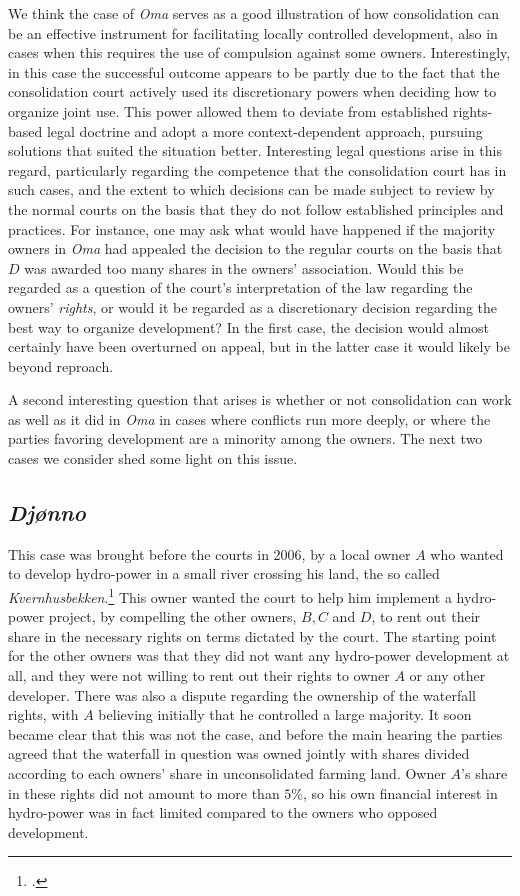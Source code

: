 We think the case of \emph{Oma} serves as a good illustration of how consolidation can be an effective instrument for facilitating locally controlled development, also in cases when this requires the use of compulsion against some owners. Interestingly, in this case the successful outcome appears to be partly due to the fact that the consolidation court actively used its discretionary powers when deciding how to organize joint use. This power allowed them to deviate from established rights-based legal doctrine and adopt a more context-dependent approach, pursuing solutions that suited the situation better. Interesting legal questions arise in this regard, particularly regarding the competence that the consolidation court has in such cases, and the extent to which decisions can be made subject to review by the normal courts on the basis that they do not follow established principles and practices. For instance, one may ask what would have happened if the majority owners in \emph{Oma} had appealed the decision to the regular courts on the basis that $D$ was awarded too many shares in the owners' association. Would this be regarded as a question of the court's interpretation of the law regarding the owners' \emph{rights}, or would it be regarded as a discretionary decision regarding the best way to organize development? In the first case, the decision would almost certainly have been overturned on appeal, but in the latter case it would likely be beyond reproach.

A second interesting question that arises is whether or not consolidation can work as well as it did in \emph{Oma} in cases where conflicts run more deeply, or where the parties favoring development are a minority among the owners. The next two cases we consider shed some light on this issue.

\subsection{\emph{Djønno}}

This case was brought before the courts in 2006, by a local owner $A$ who wanted to develop hydro-power in a small river crossing his land, the so called \emph{Kvernhusbekken}.\footcite{djonno06} This owner wanted the court to help him implement a hydro-power project, by compelling the other owners, $B, C$ and $D$, to rent out their share in the necessary rights on terms dictated by the court. The starting point for the other owners was that they did not want any hydro-power development at all, and they were not willing to rent out their rights to owner $A$ or any other developer. There was also a dispute regarding the ownership of the waterfall rights, with $A$ believing initially that he controlled a large majority. It soon became clear that this was not the case, and before the main hearing the parties agreed that the waterfall in question was owned jointly with shares divided according to each owners' share in unconsolidated farming land. Owner $A$'s share in these rights did not amount to more than $5 \%$, so his own financial interest in hydro-power was in fact limited compared to the owners who opposed development.


